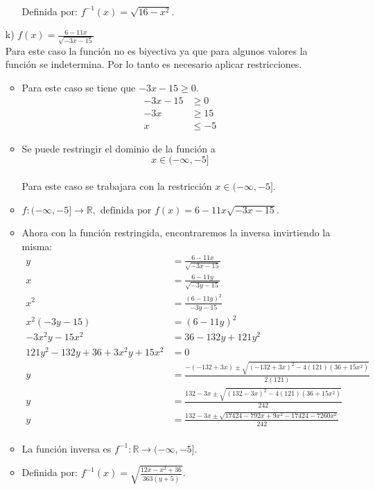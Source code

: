 \documentclass{templateNote}
\begin{document}
\begin{itemize}
\begin{itemize}
        \\Definida por: $f^{-1}(x) = \sqrt{16 - x^2}$.
    \end{itemize}
    \item[k)] $f(x) = \frac{6 - 11x}{\sqrt{-3x - 15}}$
    \\
    Para este caso la función no es biyectiva ya que para algunos valores la función se indetermina. Por lo tanto es necesario aplicar restricciones.\\
    \begin{itemize}
        \item Para este caso se tiene que $-3x - 15 \geq 0$.
        \begin{align*}
            -3x - 15 &\geq 0 \\
            -3x &\geq 15 \\
            x &\leq -5
        \end{align*}
        \item Se puede restringir el dominio de la función a \\ \[x \in (-\infty, -5] \] \\Para este caso se trabajara con la restricción $x \in (-\infty, -5]$.
        \item $f:(-\infty, -5] \rightarrow \mathbb{R}, \text{ definida por } f(x) = 6 - 11x\sqrt{-3x - 15}$.
        \item Ahora con la función restringida, encontraremos la inversa invirtiendo la misma:
        \begin{align*}
            y &= \frac{6 - 11x}{\sqrt{-3x - 15}} \\
            x &= \frac{6 - 11y}{\sqrt{-3y - 15}} \\
            x^2 &= \frac{(6 - 11y)^2}{-3y - 15} \\
            x^2(-3y - 15) &= (6 - 11y)^2 \\
            -3x^2y - 15x^2 &= 36 - 132y + 121y^2 \\
            121y^2 - 132y + 36 + 3x^2y + 15x^2 &= 0 \\
            y &= \frac{-(-132+3x) \pm \sqrt{(-132+3x)^2 - 4(121)(36 + 15x^2)}}{2(121)} \\
            y &= \frac{132-3x \pm \sqrt{(132-3x)^2 - 4(121)(36 + 15x^2)}}{242} \\
            y &= \frac{132-3x \pm \sqrt{17424 - 792x + 9x^2 - 17424 - 7260x^2}}{242} \\
        \end{align*}
        \item La función inversa es $f^{-1}: \mathbb{R} \rightarrow (-\infty, -5]$.
        \item Definida por: $f^{-1}(x) = \sqrt{\frac{12x - x^2 + 36}{363(y + 5)}}$.
    \end{itemize}
\end{itemize}
\newpage
\end{document}
